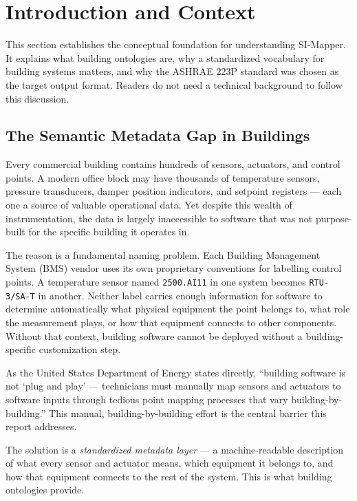 \section{Introduction and Context}
\label{sec:introduction}

This section establishes the conceptual foundation for understanding SI-Mapper.
It explains what building ontologies are, why a standardized vocabulary for building systems matters,
and why the ASHRAE 223P standard was chosen as the target output format.
Readers do not need a technical background to follow this discussion.

\subsection{The Semantic Metadata Gap in Buildings}
\label{subsec:metadata-gap}

Every commercial building contains hundreds of sensors, actuators, and control points.
A modern office block may have thousands of temperature sensors, pressure transducers, damper position
indicators, and setpoint registers --- each one a source of valuable operational data.
Yet despite this wealth of instrumentation, the data is largely inaccessible to software that was
not purpose-built for the specific building it operates in.

The reason is a fundamental naming problem.
Each Building Management System (BMS) vendor uses its own proprietary conventions for labelling control
points.
A temperature sensor named \texttt{2500.AI11} in one system becomes \texttt{RTU-3/SA-T} in another.
Neither label carries enough information for software to determine automatically what physical equipment
the point belongs to, what role the measurement plays, or how that equipment connects to other components.
Without that context, building software cannot be deployed without a building-specific customization step.

As the United States Department of Energy states directly, ``building software is not `plug and play' ---
technicians must manually map sensors and actuators to software inputs through tedious point mapping
processes that vary building-by-building.''
This manual, building-by-building effort is the central barrier this report addresses.

The solution is a \emph{standardized metadata layer} --- a machine-readable description of what every
sensor and actuator means, which equipment it belongs to, and how that equipment connects to the rest of
the system.
This is what building ontologies provide.

